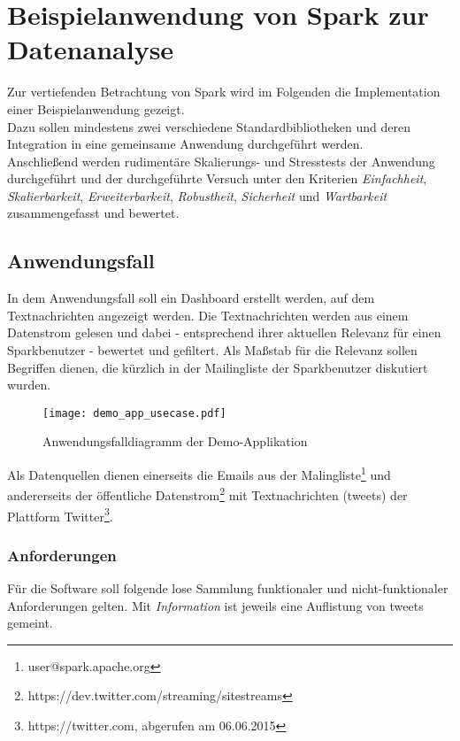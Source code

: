 \chapter{Beispielanwendung von Spark zur Datenanalyse}

Zur vertiefenden Betrachtung von Spark wird im Folgenden die Implementation einer Beispielanwendung gezeigt.\\

Dazu sollen mindestens zwei verschiedene Standardbibliotheken und deren Integration in eine gemeinsame Anwendung durchgeführt werden.\\

Anschließend werden rudimentäre Skalierungs- und Stresstests der Anwendung durchgeführt und der durchgeführte Versuch unter den Kriterien \textit{Einfachheit}, \textit{Skalierbarkeit}, \textit{Erweiterbarkeit}, \textit{Robustheit}, \textit{Sicherheit} und \textit{Wartbarkeit} zusammengefasst und bewertet.

\section{Anwendungsfall}
In dem Anwendungsfall soll ein Dashboard erstellt werden, auf dem Textnachrichten angezeigt werden.
Die Textnachrichten werden aus einem Datenstrom gelesen und dabei - entsprechend ihrer aktuellen Relevanz für einen Sparkbenutzer - bewertet und gefiltert. Als Maßstab für die Relevanz sollen Begriffen dienen, die kürzlich in der Mailingliste der Sparkbenutzer diskutiert wurden.\\

\begin{figure}[ht!]
	\centering
  \texttt{[image: demo\_app\_usecase.pdf]}
	\caption{Anwendungsfalldiagramm der Demo-Applikation}
	\label{figure:demo_app_usecase}
\end{figure}

Als Datenquellen dienen einerseits die Emails aus der Malingliste\footnote{user@spark.apache.org} und andererseits der öffentliche Datenstrom\footnote{https://dev.twitter.com/streaming/sitestreams} mit Textnachrichten (\glspl{tweet}) der Plattform Twitter\footnote{https://twitter.com, abgerufen am 06.06.2015}.

\subsection{Anforderungen}

Für die Software soll folgende lose Sammlung funktionaler und nicht-funktionaler Anforderungen gelten. Mit \textit{Information} ist jeweils eine Auflistung von \glspl{tweet} gemeint.

